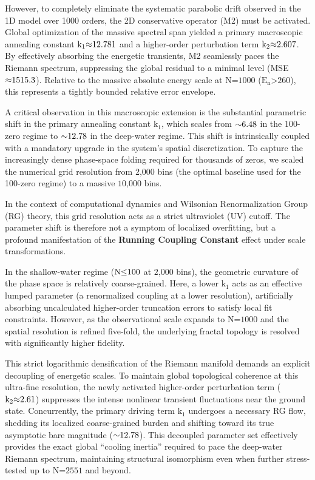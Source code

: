 \documentclass[fleqn,10pt]{wlscirep}
\begin{document}
However, to completely eliminate the systematic parabolic drift observed
in the 1D model over 1000 orders, the 2D conservative operator (M2) must
be activated. Global optimization of the massive spectral span yielded a
primary macroscopic annealing constant
\(\text{k}_{\text{1}}\text{\ensuremath{\approx}12.781}\) and a higher-order perturbation
term \(\text{k}_{\text{2}}\text{\ensuremath{\approx}2.607}\). By effectively absorbing the
energetic transients, M2 seamlessly paces the Riemann spectrum,
suppressing the global residual to a minimal level (MSE
\(\text{\ensuremath{\approx}1515.3}\)). Relative to the massive absolute energy scale at
\(\text{N}\text{=1000}\) (\(\text{E}_{\text{n}}\text{>260}\)), this
represents a tightly bounded relative error envelope.

A critical observation in this macroscopic extension is the substantial
parametric shift in the primary annealing constant
\(\text{k}_{\text{1}}\), which scales from \(\text{\ensuremath{\sim}6.48}\) in the
\(\text{100}\)-zero regime to \(\text{\ensuremath{\sim}12.78}\) in the deep-water
regime. This shift is intrinsically coupled with a mandatory upgrade in
the system's spatial discretization. To capture the increasingly dense
phase-space folding required for thousands of zeros, we scaled the
numerical grid resolution from \(\text{2,000}\) bins (the optimal
baseline used for the 100-zero regime) to a massive \(\text{10,000}\)
bins.

In the context of computational dynamics and Wilsonian Renormalization
Group (RG) theory, this grid resolution acts as a strict ultraviolet
(UV) cutoff. The parameter shift is therefore not a symptom of localized
overfitting, but a profound manifestation of the \textbf{Running
Coupling Constant} effect under scale transformations.

In the shallow-water regime (\(\text{N}\text{\ensuremath{\le}100}\) at \(\text{2,000}\)
bins), the geometric curvature of the phase space is relatively
coarse-grained. Here, a lower \(\text{k}_{\text{1}}\) acts as an
effective lumped parameter (a renormalized coupling at a lower
resolution), artificially absorbing uncalculated higher-order truncation
errors to satisfy local fit constraints. However, as the observational
scale expands to \(\text{N}\text{=1000}\) and the spatial resolution is
refined five-fold, the underlying fractal topology is resolved with
significantly higher fidelity.

This strict logarithmic densification of the Riemann manifold demands an
explicit decoupling of energetic scales. To maintain global topological
coherence at this ultra-fine resolution, the newly activated
higher-order perturbation term (\(\text{k}_{\text{2}}\text{\ensuremath{\approx}2.61}\))
suppresses the intense nonlinear transient fluctuations near the ground
state. Concurrently, the primary driving term \(\text{k}_{\text{1}}\)
undergoes a necessary RG flow, shedding its localized coarse-grained
burden and shifting toward its true asymptotic bare magnitude
(\(\text{\ensuremath{\sim}12.78}\)). This decoupled parameter set effectively provides
the exact global ``cooling inertia'' required to pace the deep-water
Riemann spectrum, maintaining structural isomorphism even when further
stress-tested up to \(\text{N}\text{=2551}\) and beyond.
\end{document}
